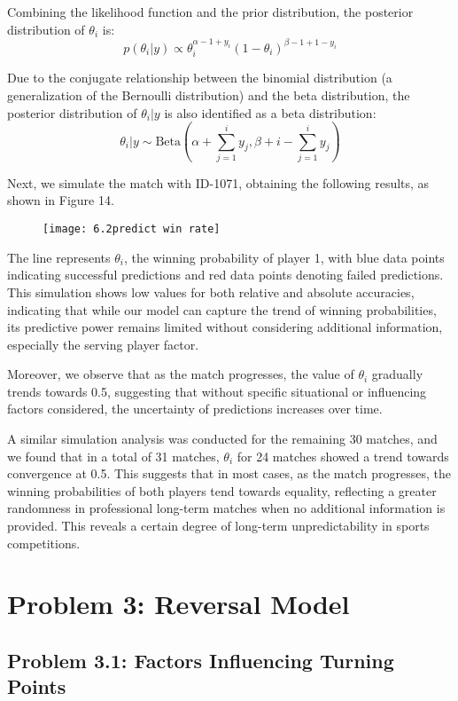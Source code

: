 \documentclass{mcmthesis}
\begin{document}
Combining the likelihood function and the prior distribution, the posterior distribution of $\theta_i$ is:
$$
p(\theta_i | y) \propto \theta_i^{\alpha-1 + y_i} (1 - \theta_i)^{\beta-1 + 1 - y_i}
$$

Due to the conjugate relationship between the binomial distribution (a generalization of the Bernoulli distribution) and the beta distribution, the posterior distribution of $\theta_i | y$ is also identified as a beta distribution:
$$
\theta_i | y \sim \text{Beta}(\alpha + \sum_{j=1}^{i} y_j, \beta + i - \sum_{j=1}^{i} y_j)
$$

Next, we simulate the match with ID-1071, obtaining the following results, as shown in Figure 14. 
\begin{figure}[ht]%
  \small
  \centering
  \texttt{[image: 6.2predict win rate]}
\end{figure}
The line represents $\theta_i$, the winning probability of player 1, with blue data points indicating successful predictions and red data points denoting failed predictions. This simulation shows low values for both relative and absolute accuracies, indicating that while our model can capture the trend of winning probabilities, its predictive power remains limited without considering additional information, especially the serving player factor.

Moreover, we observe that as the match progresses, the value of $\theta_i$ gradually trends towards 0.5, suggesting that without specific situational or influencing factors considered, the uncertainty of predictions increases over time.

A similar simulation analysis was conducted for the remaining 30 matches, and we found that in a total of 31 matches, $\theta_i$ for 24 matches showed a trend towards convergence at 0.5. This suggests that in most cases, as the match progresses, the winning probabilities of both players tend towards equality, reflecting a greater randomness in professional long-term matches when no additional information is provided. This reveals a certain degree of long-term unpredictability in sports competitions.

\section{Problem 3: Reversal Model}
\subsection{Problem 3.1: Factors Influencing Turning Points}
\end{document}
